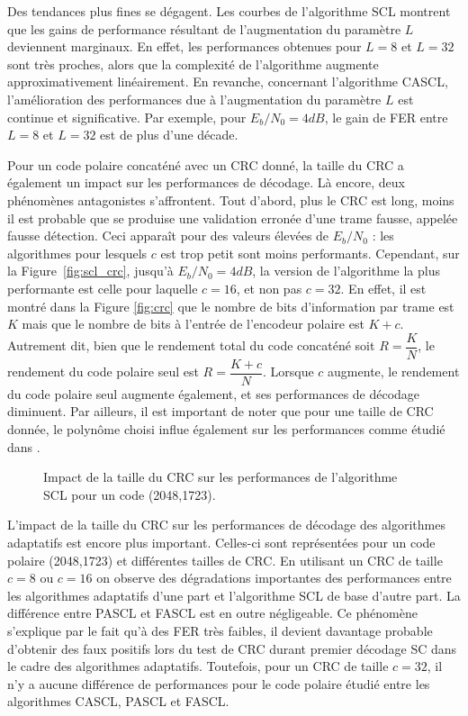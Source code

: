 Des tendances plus fines se dégagent. Les courbes de l'algorithme SCL montrent que les gains de performance résultant de l'augmentation du paramètre $L$ deviennent marginaux. En effet, les performances obtenues pour $L=8$ et $L=32$ sont très proches, alors que la complexité de l'algorithme augmente approximativement linéairement. En revanche, concernant l'algorithme CASCL, l'amélioration des performances due à l'augmentation du paramètre $L$ est continue et significative. Par exemple, pour $E_b/N_0=4dB$, le gain de FER entre $L=8$ et $L=32$ est de plus d'une décade.

Pour un code polaire concaténé avec un CRC donné, la taille du CRC a également un impact sur les performances de décodage. Là encore, deux phénomènes antagonistes s'affrontent. 
Tout d'abord, plus le CRC est long, moins il est probable que se produise une validation erronée d'une trame fausse, appelée fausse détection. Ceci apparaît pour des valeurs élevées de $E_b/N_0$ : les algorithmes pour lesquels $c$ est trop petit sont moins performants.
Cependant, sur la Figure~\ref{fig:scl_crc}, jusqu'à $E_b/N_0=4dB$, la version de l'algorithme la plus performante est celle pour laquelle $c=16$, et non pas $c=32$.
En effet, il est montré dans la Figure \ref{fig:crc} que le nombre de bits d'information par trame est $K$ mais que le nombre de bits à l'entrée de l'encodeur polaire est $K+c$. Autrement dit, bien que le rendement total du code concaténé soit $R=\dfrac{K}{N}$, le rendement du code polaire seul est $R=\dfrac{K+c}{N}$. Lorsque $c$ augmente, le rendement du code polaire seul augmente également, et ses performances de décodage diminuent. Par ailleurs, il est important de noter que pour une taille de CRC donnée, le polynôme choisi influe également sur les performances comme étudié dans \cite{zhang_crc_2017}.
\begin{figure}[t]
  \centering
  \caption{Impact de la taille du CRC sur les performances de l'algorithme SCL pour un code (2048,1723).}
\end{figure}

L'impact de la taille du CRC sur les performances de décodage des algorithmes adaptatifs est encore plus important. Celles-ci sont représentées pour un code polaire (2048,1723) et différentes tailles de CRC. En utilisant un CRC de taille $c=8$ ou $c=16$ on observe des dégradations importantes des performances entre les algorithmes adaptatifs d'une part et l'algorithme SCL de base d'autre part. La différence entre PASCL et FASCL est en outre négligeable. Ce phénomène s'explique par le fait qu'à des FER très faibles, il devient davantage probable d'obtenir des faux positifs lors du test de CRC durant premier décodage SC dans le cadre des algorithmes adaptatifs. Toutefois, pour un CRC de taille $c=32$, il n'y a aucune différence de performances pour le code polaire étudié entre les algorithmes CASCL, PASCL et FASCL.

